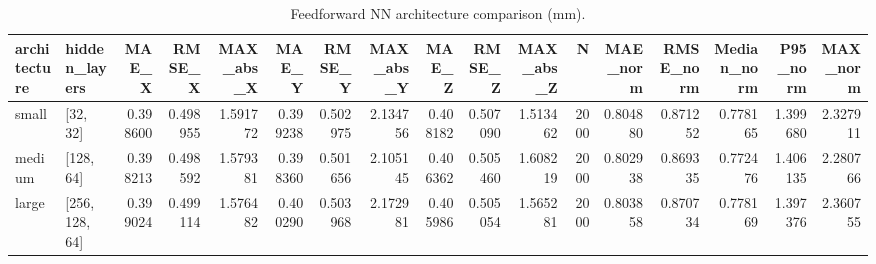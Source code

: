 \begin{table}
\caption{Feedforward NN architecture comparison (mm).}
\label{tab:summer_architecture}
\begin{tabular}{llrrrrrrrrrrrrrrr}
\toprule
architecture & hidden_layers & MAE_X & RMSE_X & MAX_abs_X & MAE_Y & RMSE_Y & MAX_abs_Y & MAE_Z & RMSE_Z & MAX_abs_Z & N & MAE_norm & RMSE_norm & Median_norm & P95_norm & MAX_norm \\
\midrule
small & [32, 32] & 0.398600 & 0.498955 & 1.591772 & 0.399238 & 0.502975 & 2.134756 & 0.408182 & 0.507090 & 1.513462 & 2000 & 0.804880 & 0.871252 & 0.778165 & 1.399680 & 2.327911 \\
medium & [128, 64] & 0.398213 & 0.498592 & 1.579381 & 0.398360 & 0.501656 & 2.105145 & 0.406362 & 0.505460 & 1.608219 & 2000 & 0.802938 & 0.869335 & 0.772476 & 1.406135 & 2.280766 \\
large & [256, 128, 64] & 0.399024 & 0.499114 & 1.576482 & 0.400290 & 0.503968 & 2.172981 & 0.405986 & 0.505054 & 1.565281 & 2000 & 0.803858 & 0.870734 & 0.778169 & 1.397376 & 2.360755 \\
\bottomrule
\end{tabular}
\end{table}
